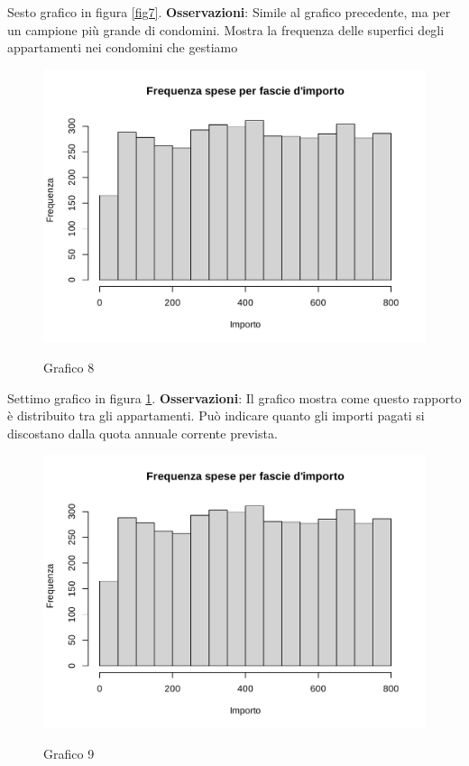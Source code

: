Sesto grafico in figura \ref{fig7}. \textbf{Osservazioni}: Simile al grafico precedente, ma per un campione più grande di condomini. Mostra la frequenza delle superfici degli appartamenti nei condomini che gestiamo


\clearpage

\begin{figure}[t]
	\caption{Grafico 8}
	\includegraphics[page=8,width=\textwidth]{../R/grafici.pdf}
	\label{fig8}
\end{figure}

Settimo grafico in figura \ref{fig8}. \textbf{Osservazioni}: Il grafico mostra come questo rapporto è distribuito tra gli appartamenti. Può indicare quanto gli importi pagati si discostano dalla quota annuale corrente prevista.

\clearpage

\begin{figure}[t]
	\caption{Grafico 9}
	\includegraphics[page=9,width=\textwidth]{../R/grafici.pdf}
	\label{fig9}
\end{figure}



